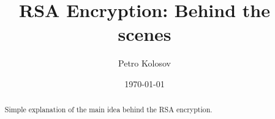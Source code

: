 \documentclass[12pt,letterpaper,oneside,reqno]{amsart}
\title[RSA Encryption: Behind the scenes]{RSA Encryption: Behind the scenes}
\author[Petro Kolosov]{Petro Kolosov}
\date{\today}
\begin{document}
    \begin{abstract}
        Simple explanation of the main idea behind the RSA encryption.
    \end{abstract}
    \maketitle
    \tableofcontents


%
%
%
%
%
%
%
%
\end{document}
